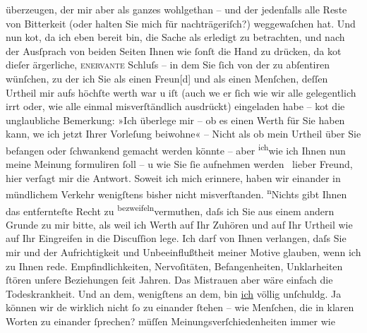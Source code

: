 \begin{ledgroupsized}[t]{13cm}
               überzeugen, der mir aber als ganzes wohlgethan – und der jedenfalls alle Reste von
               Bitterkeit (oder halten Sie mich für nachträgeriſch?) weggewaſchen hat. Und nun ko{\geminationm}t, da ich eben bereit bin, die Sache als erledigt zu
               betrachten, und nach der Ausſprach von beiden Seiten {\pb}Ihnen wie ſonſt die Hand zu drücken, da ko{\geminationm}t dieſer ärgerliche, \textsc{enervante} Schluſs – in dem Sie ſich von der \label{K_L02989-2v}\label{K_L02989-2h} zu abſentiren wünſchen, zu der ich Sie als einen Freun{[}d{]}
               und als einen Menſchen, deſſen Urtheil mir aufs höchſte werth war u iſt (auch we{\geminationn} er ſich wie wir alle {\pb}gelegentlich irrt oder, wie alle einmal
               misverſtändlich ausdrückt) eingeladen habe – ko{\geminationm}t die
               unglaubliche Bemerkung: »Ich überlege mir – ob es einen Werth für Sie haben kann,
                  we{\geminationn} ich jetzt Ihrer Vorleſung beiwohne{\dotstwo}« – Nicht als ob mein Urtheil über Sie befangen oder
               ſchwankend gemacht werden könnte – aber \substVorne{}\textsuperscript{ich}\substDazwischen{}wie\substHinten{} ich Ihnen nun meine {\pb}Meinung
               formuliren ſoll – u wie Sie ſie aufnehmen werden {\dotsfive} lieber Freund, hier verſagt mir die Antwort. Soweit ich
               mich erinnere, haben wir einander in mündlichem Verkehr wenigſtens bisher nicht
               misverſtanden. \substVorne{}\textsuperscript{n}\substDazwischen{}N\substHinten{}ichts gibt Ihnen das
               entfernteſte Recht zu \substVorne{}\textsuperscript{bezweifeln}{\allowbreak}\substDazwischen{}vermuthen\substHinten{}, daſs ich Sie aus einem andern {\pb}Grunde zu mir bitte, als weil ich Werth auf Ihr Zuhören und auf Ihr Urtheil wie auf
               Ihr Eingreifen in die Discuſſion lege. Ich darf von Ihnen verlangen, daſs Sie mir und
               der Aufrichtigkeit \introOben{}und Unbeeinflußtheit\introOben{} meiner Motive
               glauben, wenn ich zu Ihnen rede. Empfindlichkeiten, Nervoſitäten, Befan{\pb}genheiten, Unklarheiten ſtören unſere
               Beziehungen ſeit Jahren. Das Mistrauen aber wäre einfach die Todeskrankheit. Und an
               dem, wenigſtens an dem, bin \uline{ich} völlig unſchuldg. Ja
               können wir de{\geminationn} wirklich nicht ſo zu einander ſtehen –
               wie Menſchen, die in klaren Worten zu einander ſprechen? {\pb}müſſen Meinungsverſchiedenheiten immer wie

\end{ledgroupsized}

